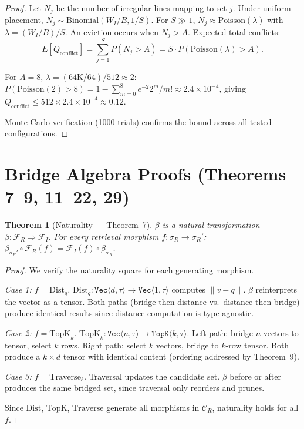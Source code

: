 \documentclass{article}
\newtheorem{theorem}{Theorem}
\theoremstyle{definition}
\theoremstyle{remark}
\begin{document}
\begin{proof}
Let $N_j$ be the number of irregular lines mapping to set $j$. Under uniform placement, $N_j \sim \mathrm{Binomial}(W_I/B, 1/S)$. For $S \gg 1$, $N_j \approx \mathrm{Poisson}(\lambda)$ with $\lambda = (W_I/B)/S$. An eviction occurs when $N_j > A$. Expected total conflicts:
\[
  E[Q_{\text{conflict}}] = \sum_{j=1}^{S} P(N_j > A) = S \cdot P(\mathrm{Poisson}(\lambda) > A).
\]

For $A=8$, $\lambda = (64\text{K}/64)/512 \approx 2$:
$P(\mathrm{Poisson}(2) > 8) = 1 - \sum_{m=0}^{8} e^{-2} 2^m/m! \approx 2.4 \times 10^{-4}$,
giving $Q_{\text{conflict}} \leq 512 \times 2.4 \times 10^{-4} \approx 0.12$.

Monte Carlo verification (1000 trials) confirms the bound across all tested configurations.
\end{proof}

\section{Bridge Algebra Proofs (Theorems 7--9, 11--22, 29)}\label{app:bridge-proofs}

\begin{theorem}[Naturality --- Theorem~7]\label{thm:naturality-app}
$\beta$ is a natural transformation $\beta : \mathcal{F}_R \Rightarrow \mathcal{F}_I$. For every retrieval morphism $f : \sigma_R \to \sigma_R'$:
$\beta_{\sigma_R'} \circ \mathcal{F}_R(f) = \mathcal{F}_I(f) \circ \beta_{\sigma_R}$.
\end{theorem}

\begin{proof}
We verify the naturality square for each generating morphism.

\emph{Case 1: $f = \mathrm{Dist}_q$.}
$\mathrm{Dist}_q : \texttt{Vec}\langle d,\tau\rangle \to \texttt{Vec}\langle 1,\tau\rangle$ computes $\|v-q\|$. $\beta$ reinterprets the vector as a tensor. Both paths (bridge-then-distance vs.\ distance-then-bridge) produce identical results since distance computation is type-agnostic.

\emph{Case 2: $f = \mathrm{TopK}_k$.}
$\mathrm{TopK}_k : \texttt{Vec}\langle n,\tau\rangle \to \texttt{TopK}\langle k,\tau\rangle$. Left path: bridge $n$ vectors to tensor, select $k$ rows. Right path: select $k$ vectors, bridge to $k$-row tensor. Both produce a $k \times d$ tensor with identical content (ordering addressed by Theorem~9).

\emph{Case 3: $f = \mathrm{Traverse}_\ell$.}
Traversal updates the candidate set. $\beta$ before or after produces the same bridged set, since traversal only reorders and prunes.

Since $\mathrm{Dist}$, $\mathrm{TopK}$, $\mathrm{Traverse}$ generate all morphisms in $\mathcal{C}_R$, naturality holds for all $f$.
\end{proof}
\end{document}
